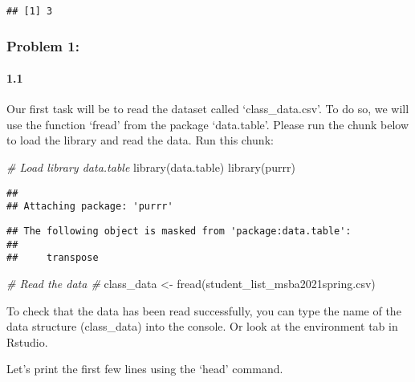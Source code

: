 \documentclass[
]{article}
\newenvironment{Shaded}{\begin{snugshade}}{\end{snugshade}}
\newcommand{\CommentTok}[1]{\textcolor[rgb]{0.56,0.35,0.01}{\textit{#1}}}
\newcommand{\FunctionTok}[1]{\textcolor[rgb]{0.00,0.00,0.00}{#1}}
\newcommand{\NormalTok}[1]{#1}
\newcommand{\OtherTok}[1]{\textcolor[rgb]{0.56,0.35,0.01}{#1}}
\newcommand{\StringTok}[1]{\textcolor[rgb]{0.31,0.60,0.02}{#1}}
\begin{document}
\begin{verbatim}
## [1] 3
\end{verbatim}

\hypertarget{problem-1}{%
\subsubsection{Problem 1:}\label{problem-1}}

\hypertarget{section}{%
\paragraph{1.1}\label{section}}

Our first task will be to read the dataset called `class\_data.csv'. To
do so, we will use the function `fread' from the package `data.table'.
Please run the chunk below to load the library and read the data. Run
this chunk:

\begin{Shaded}
\begin{Highlighting}[]
\CommentTok{\# Load library \textquotesingle{}data.table\textquotesingle{}}
\FunctionTok{library}\NormalTok{(data.table)}
\FunctionTok{library}\NormalTok{(purrr)}
\end{Highlighting}
\end{Shaded}

\begin{verbatim}
## 
## Attaching package: 'purrr'
\end{verbatim}

\begin{verbatim}
## The following object is masked from 'package:data.table':
## 
##     transpose
\end{verbatim}

\begin{Shaded}
\begin{Highlighting}[]
\CommentTok{\# Read the data \#}
\NormalTok{class\_data }\OtherTok{\textless{}{-}} \FunctionTok{fread}\NormalTok{(}\StringTok{\textquotesingle{}student\_list\_msba2021spring.csv\textquotesingle{}}\NormalTok{)}
\end{Highlighting}
\end{Shaded}

To check that the data has been read successfully, you can type the name
of the data structure (class\_data) into the console. Or look at the
environment tab in Rstudio.

Let's print the first few lines using the `head' command.
\end{document}

